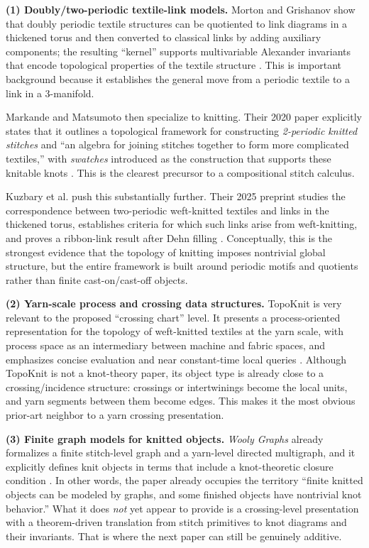 \documentclass[11pt]{article}
\newcommand{\memoheader}[1]{\vspace{0.4em}{\large\bfseries\color{heading} #1}\par\vspace{0.2em}}
\begin{document}
\memoheader{Closest prior art and what it covers}
\textbf{(1) Doubly/two-periodic textile-link models.} Morton and Grishanov show that doubly periodic textile structures can be quotiented to link diagrams in a thickened torus and then converted to classical links by adding auxiliary components; the resulting ``kernel'' supports multivariable Alexander invariants that encode topological properties of the textile structure \citep{MortonGrishanov2009}. This is important background because it establishes the general move from a periodic textile to a link in a 3-manifold.

Markande and Matsumoto then specialize to knitting. Their 2020 paper explicitly states that it outlines a topological framework for constructing \emph{2-periodic knitted stitches} and ``an algebra for joining stitches together to form more complicated textiles,'' with \emph{swatches} introduced as the construction that supports these knitable knots \citep{MarkandeMatsumoto2020}. This is the clearest precursor to a compositional stitch calculus.

Kuzbary et al. push this substantially further. Their 2025 preprint studies the correspondence between two-periodic weft-knitted textiles and links in the thickened torus, establishes criteria for which such links arise from weft-knitting, and proves a ribbon-link result after Dehn filling \citep{KuzbaryEtAl2025}. Conceptually, this is the strongest evidence that the topology of knitting imposes nontrivial global structure, but the entire framework is built around periodic motifs and quotients rather than finite cast-on/cast-off objects.

\textbf{(2) Yarn-scale process and crossing data structures.} TopoKnit is very relevant to the proposed ``crossing chart'' level. It presents a process-oriented representation for the topology of weft-knitted textiles at the yarn scale, with process space as an intermediary between machine and fabric spaces, and emphasizes concise evaluation and near constant-time local queries \citep{KapllaniEtAl2021}. Although TopoKnit is not a knot-theory paper, its object type is already close to a crossing/incidence structure: crossings or intertwinings become the local units, and yarn segments between them become edges. This makes it the most obvious prior-art neighbor to a yarn crossing presentation.

\textbf{(3) Finite graph models for knitted objects.} \emph{Wooly Graphs} already formalizes a finite stitch-level graph and a yarn-level directed multigraph, and it explicitly defines knit objects in terms that include a knot-theoretic closure condition \citep{GrayEtAl2024}. In other words, the paper already occupies the territory ``finite knitted objects can be modeled by graphs, and some finished objects have nontrivial knot behavior.'' What it does \emph{not} yet appear to provide is a crossing-level presentation with a theorem-driven translation from stitch primitives to knot diagrams and their invariants. That is where the next paper can still be genuinely additive.
\end{document}
